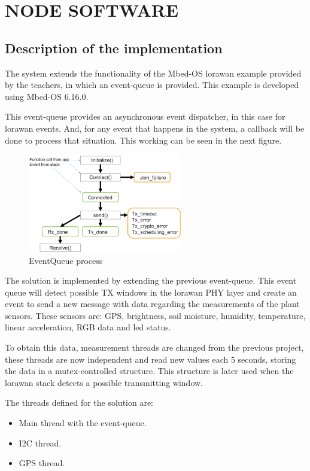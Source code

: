\section{NODE SOFTWARE}

\subsection{Description of the implementation}

The system extends the functionality of the Mbed-OS \acrshort{lorawan} example provided by the teachers, in which an event-queue is provided. This example is developed using Mbed-OS 6.16.0.

This event-queue provides an asynchronous event dispatcher, in this case for \acrshort{lorawan} events. And, for any event that happens in the system, a callback will be done to process that situation. This working can be seen in the next figure.

\begin{figure}[H]
    \centering
    \includegraphics[width=0.6\textwidth]{images/4/event-queue.png}
    \caption{EventQueue process\cite{SensorNetworksProject1_slides_2024}}
    \label{fig:events}
\end{figure}

The solution is implemented by extending the previous event-queue. This event queue will detect possible TX windows in the \acrshort{lorawan} PHY layer and create an event to send a new message with data regarding the measurements of the plant sensors. These sensors are: 
GPS, brightness, soil moisture, humidity, temperature, linear acceleration, RGB data and led status.

To obtain this data, measurement threads are changed from the previous project, these threads are now independent and read new values each 5 seconds, storing the data in a mutex-controlled structure. This structure is later used when the \acrshort{lorawan} stack detects a possible transmitting window.

The threads defined for the solution are:
\begin{itemize}
    \item Main thread with the event-queue.
    \item I2C thread.
    \item GPS thread.
\end{itemize}
